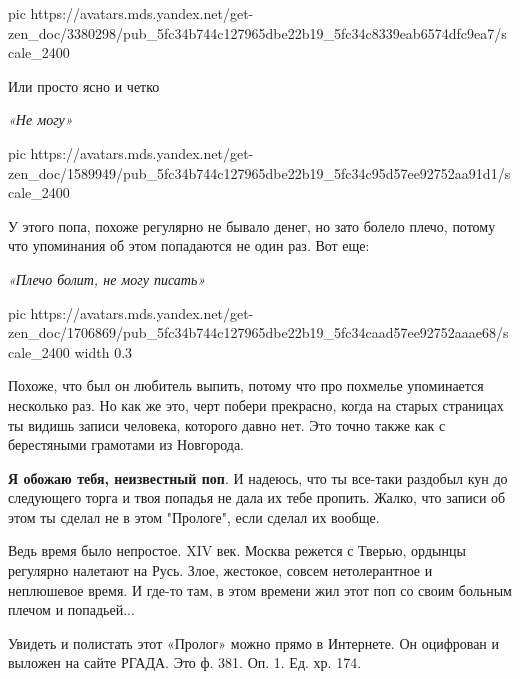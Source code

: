 \ifcmt
pic https://avatars.mds.yandex.net/get-zen_doc/3380298/pub_5fc34b744c127965dbe22b19_5fc34c8339eab6574dfc9ea7/scale_2400
\fi

Или просто ясно и четко

\begin{leftbar}
	\begingroup
		\em «Не могу» 
	\endgroup
\end{leftbar}

\ifcmt
pic https://avatars.mds.yandex.net/get-zen_doc/1589949/pub_5fc34b744c127965dbe22b19_5fc34c95d57ee92752aa91d1/scale_2400
\fi

У этого попа, похоже регулярно не бывало денег, но зато болело плечо, потому
что упоминания об этом попадаются не один раз. Вот еще:

\begin{leftbar}
	\begingroup
		\em «Плечо болит, не могу писать» 
	\endgroup
\end{leftbar}

\ifcmt
pic https://avatars.mds.yandex.net/get-zen_doc/1706869/pub_5fc34b744c127965dbe22b19_5fc34caad57ee92752aaae68/scale_2400
width 0.3
\fi

Похоже, что был он любитель выпить, потому что про похмелье упоминается
несколько раз. Но как же это, черт побери прекрасно, когда на старых страницах
ты видишь записи человека, которого давно нет. Это точно также как с
берестяными грамотами из Новгорода.

\textbf{Я обожаю тебя, неизвестный поп}. И надеюсь, что ты все-таки раздобыл
кун до следующего торга и твоя попадья не дала их тебе пропить. Жалко, что
записи об этом ты сделал не в этом "Прологе", если сделал их вообще.

Ведь время было непростое. XIV век. Москва режется с Тверью, ордынцы регулярно
налетают на Русь. Злое, жестокое, совсем нетолерантное и неплюшевое время. И
где-то там, в этом времени жил этот поп со своим больным плечом и попадьей...

Увидеть и полистать этот «Пролог» можно прямо в Интернете. Он оцифрован и
выложен на сайте РГАДА. Это ф. 381. Оп. 1. Ед. хр. 174.



